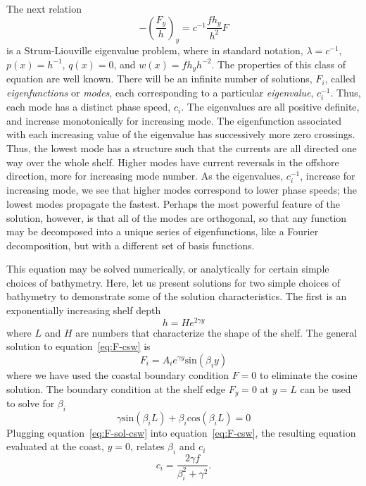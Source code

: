 \documentclass[11pt]{report}
\numberwithin{equation}{section}
\begin{document}
The next relation
\begin{equation}
    \label{eq:F-csw}
      - \left( \frac{F_y}{h}  \right)_y   = c^{-1} \frac{f h_y}{h^2} F
\end{equation}
is a Strum-Liouville eigenvalue problem, where in standard notation, $\lambda = c^{-1}$, $p(x)=h^{-1}$, $q(x)=0$, and $w(x)=f h_y h^{-2}$.  The properties of this class of equation are well known.  There will be an infinite number of solutions, $F_i$, called {\it eigenfunctions} or {\it modes}, each corresponding to a particular {\it eigenvalue}, $c^{-1}_i$.  Thus, each mode has a distinct phase speed, $c_i$.  The eigenvalues are all positive definite, and  increase monotonically for increasing mode.  The eigenfunction associated with each increasing value of the eigenvalue has successively more zero crossings.  Thus, the lowest mode has a structure such that the currents are all directed one way over the whole shelf.  Higher modes have current reversals in the offshore direction, more for increasing mode number.  As the eigenvalues, $c^{-1}_i$, increase for increasing mode, we see that higher modes correspond to lower phase speeds; the lowest modes propagate the fastest.  Perhaps the most powerful feature of the solution, however, is that all of the modes are orthogonal, so that any function may be decomposed into a unique series of eigenfunctions, like a Fourier decomposition, but with a different set of basis functions.

This equation may be solved numerically, or analytically for certain simple choices of bathymetry.  Here, let us present solutions for two simple choices of bathymetry to demonstrate some of the solution characteristics.  The first is an exponentially increasing shelf depth
\begin{equation}
    h = H e^{2 \gamma y}
\end{equation}
where $L$ and $H$ are numbers that characterize the shape of the shelf.  The general solution to equation~\ref{eq:F-csw} is
\begin{equation}
    \label{eq:F-sol-csw}
    F_i = A_i e^{\gamma y} \mathrm{sin}(\beta_i y)
\end{equation}
where we have used the coastal boundary condition $F=0$ to eliminate the cosine solution.  The boundary condition at the shelf edge $F_y = 0$ at $y=L$ can be used to solve for $\beta_i$
\begin{equation}
    \gamma \mathrm{sin}(\beta_i L) + \beta_i \mathrm{cos}(\beta_i L) = 0
\end{equation}
Plugging equation~\ref{eq:F-sol-csw} into equation~\ref{eq:F-csw}, the resulting equation evaluated at the coast, $y=0$, relates $\beta_i$ and $c_i$
\begin{equation}
    c_i = \frac{2 \gamma f}{\beta_i^2 + \gamma^2}.
\end{equation}
\end{document}
